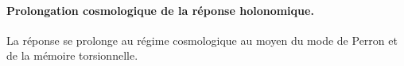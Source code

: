 \let\HMTOwnerSubsubsection\subsubsection
\let\HMTOwnerParagraph\paragraph
\let\chapter\HMTOwnerSection
\let\section\HMTOwnerSubsection
\let\subsection\HMTOwnerSubsubsection
\let\subsubsection\HMTOwnerParagraph

\endgroup
\paragraph{Prolongation cosmologique de la réponse holonomique.}
La réponse se prolonge au régime cosmologique au moyen du mode de Perron et
de la mémoire torsionnelle.


